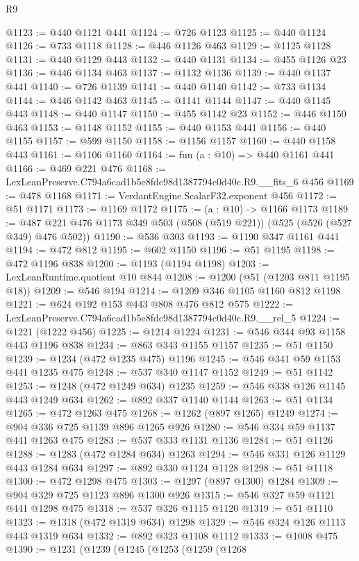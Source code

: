 \begin{lexlean}{R9}
\begin{coremodule}
@1123 := @440 @1121 @441
@1124 := @726 @1123
@1125 := @440 @1124
@1126 := @733 @1118
@1128 := @446 @1126 @463
@1129 := @1125 @1128
@1131 := @440 @1129 @443
@1132 := @440 @1131
@1134 := @455 @1126 @23
@1136 := @446 @1134 @463
@1137 := @1132 @1136
@1139 := @440 @1137 @441
@1140 := @726 @1139
@1141 := @440 @1140
@1142 := @733 @1134
@1144 := @446 @1142 @463
@1145 := @1141 @1144
@1147 := @440 @1145 @443
@1148 := @440 @1147
@1150 := @455 @1142 @23
@1152 := @446 @1150 @463
@1153 := @1148 @1152
@1155 := @440 @1153 @441
@1156 := @440 @1155
@1157 := @599 @1150
@1158 := @1156 @1157
@1160 := @440 @1158 @443
@1161 := @1106 @1160
@1164 := fun (a : @10) => @440 @1161 @441
@1166 := @469 @221 @476
@1168 := LexLeanPreserve.C794a6cad1b5e8fdc98d1387794c0d40c.R9.__fits_6 @456
@1169 := @478 @1168
@1171 := VerdantEngine.ScalarF32.exponent @456
@1172 := @51 @1171
@1173 := @1169 @1172
@1175 := (a : @10) -> @1166 @1173
@1189 := @487 @221 @476 @1173 @349 @503 (@508 (@519 @221)) (@525 (@526 (@527 @349) @476 @502))
@1190 := @536 @303
@1193 := @1190 @347 @1161 @441
@1194 := @472 @812
@1195 := @602 @1150
@1196 := @51 @1195
@1198 := @472 @1196 @838
@1200 := @1193 (@1194 @1198)
@1203 := LexLeanRuntime.quotient @10 @844
@1208 := @1200 (@51 (@1203 @811 @1195 @18))
@1209 := @546 @194
@1214 := @1209 @346 @1105 @1160 @812 @1198
@1221 := @624 @192 @153 @443 @808 @476 @812 @575
@1222 := LexLeanPreserve.C794a6cad1b5e8fdc98d1387794c0d40c.R9.__rel_5
@1224 := @1221 (@1222 @456)
@1225 := @1214 @1224
@1231 := @546 @344 @93 @1158 @443 @1196 @838
@1234 := @863 @343 @1155 @1157
@1235 := @51 @1150
@1239 := @1234 (@472 @1235 @475) @1196
@1245 := @546 @341 @59 @1153 @441 @1235 @475
@1248 := @537 @340 @1147 @1152
@1249 := @51 @1142
@1253 := @1248 (@472 @1249 @634) @1235
@1259 := @546 @338 @126 @1145 @443 @1249 @634
@1262 := @892 @337 @1140 @1144
@1263 := @51 @1134
@1265 := @472 @1263 @475
@1268 := @1262 (@897 @1265) @1249
@1274 := @904 @336 @725 @1139 @896 @1265 @926
@1280 := @546 @334 @59 @1137 @441 @1263 @475
@1283 := @537 @333 @1131 @1136
@1284 := @51 @1126
@1288 := @1283 (@472 @1284 @634) @1263
@1294 := @546 @331 @126 @1129 @443 @1284 @634
@1297 := @892 @330 @1124 @1128
@1298 := @51 @1118
@1300 := @472 @1298 @475
@1303 := @1297 (@897 @1300) @1284
@1309 := @904 @329 @725 @1123 @896 @1300 @926
@1315 := @546 @327 @59 @1121 @441 @1298 @475
@1318 := @537 @326 @1115 @1120
@1319 := @51 @1110
@1323 := @1318 (@472 @1319 @634) @1298
@1329 := @546 @324 @126 @1113 @443 @1319 @634
@1332 := @892 @323 @1108 @1112
@1333 := @1008 @475
@1390 := @1231
    (@1239
      (@1245
        (@1253
          (@1259
            (@1268

\end{coremodule}
\end{lexlean}
